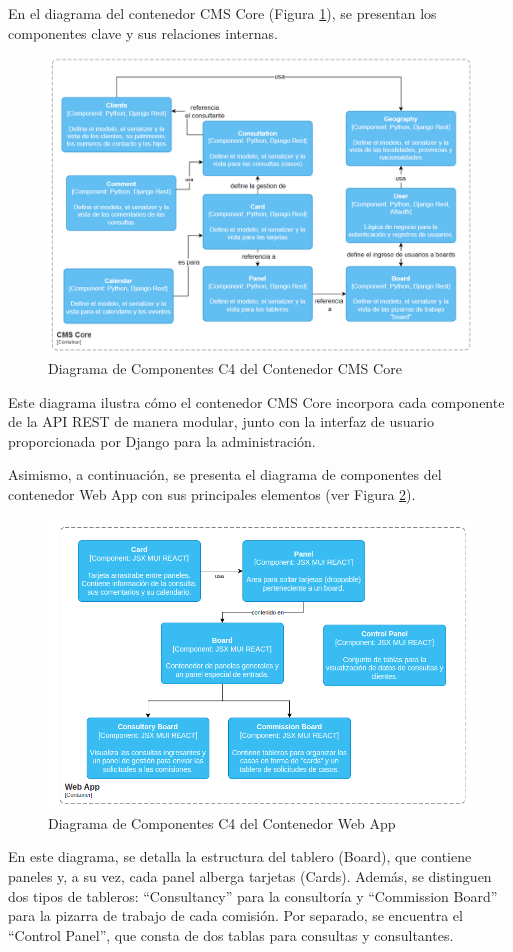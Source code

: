 En el diagrama del contenedor CMS Core (Figura \ref{fig:c4-03-cmscore}), se presentan los componentes clave y sus relaciones internas.
\begin{figure}[H]
\centering
\includegraphics[width=1\linewidth]{fig/container-cms-core.png}
\caption{Diagrama de Componentes C4 del Contenedor CMS Core}
\label{fig:c4-03-cmscore}
\end{figure}
Este diagrama ilustra cómo el contenedor CMS Core incorpora cada componente de la API REST de manera modular, junto con la interfaz de usuario proporcionada por Django para la administración.

Asimismo, a continuación, se presenta el diagrama de componentes del contenedor Web App con sus principales elementos (ver Figura \ref{fig:c4-03-webapp}).
\begin{figure}[H]
\centering
\includegraphics[width=1\linewidth]{fig/container-web-app.png}
\caption{Diagrama de Componentes C4 del Contenedor Web App}
\label{fig:c4-03-webapp}
\end{figure}
En este diagrama, se detalla la estructura del tablero (Board), que contiene paneles y, a su vez, cada panel alberga tarjetas (Cards). Además, se distinguen dos tipos de tableros: ``Consultancy'' para la consultoría y ``Commission Board'' para la pizarra de trabajo de cada comisión. Por separado, se encuentra el ``Control Panel'', que consta de dos tablas para consultas y consultantes.


